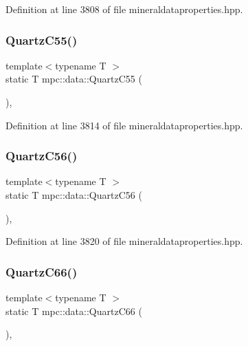 Definition at line 3808 of file mineraldataproperties.\+hpp.

\mbox{\label{namespacempc_1_1data_adb886dc69088232e2380eca2d796ed48}} 
\subsubsection{\texorpdfstring{Quartz\+C55()}{QuartzC55()}}
{\footnotesize\ttfamily template$<$typename T $>$ \\
static T mpc\+::data\+::\+Quartz\+C55 (\begin{DoxyParamCaption}{ }\end{DoxyParamCaption})\hspace{0.3cm}{\ttfamily [inline]}, {\ttfamily [static]}}



Definition at line 3814 of file mineraldataproperties.\+hpp.

\mbox{\label{namespacempc_1_1data_a653a8e49b5eced21eca429e1109c2d91}} 
\subsubsection{\texorpdfstring{Quartz\+C56()}{QuartzC56()}}
{\footnotesize\ttfamily template$<$typename T $>$ \\
static T mpc\+::data\+::\+Quartz\+C56 (\begin{DoxyParamCaption}{ }\end{DoxyParamCaption})\hspace{0.3cm}{\ttfamily [inline]}, {\ttfamily [static]}}



Definition at line 3820 of file mineraldataproperties.\+hpp.

\mbox{\label{namespacempc_1_1data_a45e2a5fcad934800dcc84de5a32fe736}} 
\subsubsection{\texorpdfstring{Quartz\+C66()}{QuartzC66()}}
{\footnotesize\ttfamily template$<$typename T $>$ \\
static T mpc\+::data\+::\+Quartz\+C66 (\begin{DoxyParamCaption}{ }\end{DoxyParamCaption})\hspace{0.3cm}{\ttfamily [inline]}, {\ttfamily [static]}}



